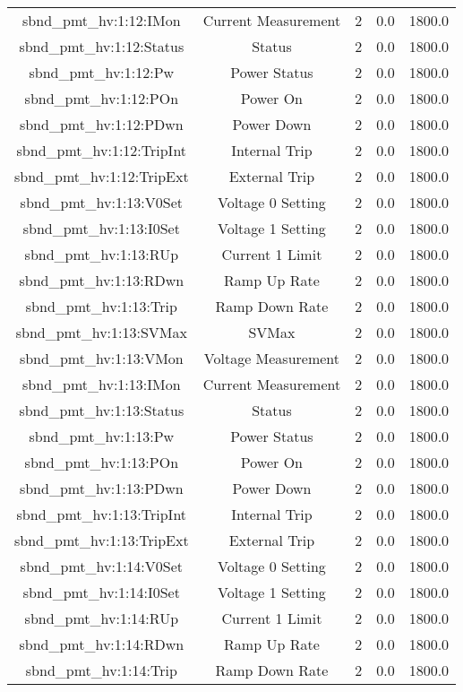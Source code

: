 \begin{table}[ptb]
\begin{tabular}{c | c c c c}
sbnd_pmt_hv:1:12:IMon & Current Measurement & 2 & 0.0 & 1800.0\\ 
sbnd_pmt_hv:1:12:Status & Status & 2 & 0.0 & 1800.0\\ 
sbnd_pmt_hv:1:12:Pw & Power Status & 2 & 0.0 & 1800.0\\ 
sbnd_pmt_hv:1:12:POn & Power On & 2 & 0.0 & 1800.0\\ 
sbnd_pmt_hv:1:12:PDwn & Power Down & 2 & 0.0 & 1800.0\\ 
sbnd_pmt_hv:1:12:TripInt & Internal Trip & 2 & 0.0 & 1800.0\\ 
sbnd_pmt_hv:1:12:TripExt & External Trip & 2 & 0.0 & 1800.0\\ 
sbnd_pmt_hv:1:13:V0Set & Voltage 0 Setting & 2 & 0.0 & 1800.0\\ 
sbnd_pmt_hv:1:13:I0Set & Voltage 1 Setting & 2 & 0.0 & 1800.0\\ 
sbnd_pmt_hv:1:13:RUp & Current 1 Limit & 2 & 0.0 & 1800.0\\ 
sbnd_pmt_hv:1:13:RDwn & Ramp Up Rate & 2 & 0.0 & 1800.0\\ 
sbnd_pmt_hv:1:13:Trip & Ramp Down Rate & 2 & 0.0 & 1800.0\\ 
sbnd_pmt_hv:1:13:SVMax & SVMax & 2 & 0.0 & 1800.0\\ 
sbnd_pmt_hv:1:13:VMon & Voltage Measurement & 2 & 0.0 & 1800.0\\ 
sbnd_pmt_hv:1:13:IMon & Current Measurement & 2 & 0.0 & 1800.0\\ 
sbnd_pmt_hv:1:13:Status & Status & 2 & 0.0 & 1800.0\\ 
sbnd_pmt_hv:1:13:Pw & Power Status & 2 & 0.0 & 1800.0\\ 
sbnd_pmt_hv:1:13:POn & Power On & 2 & 0.0 & 1800.0\\ 
sbnd_pmt_hv:1:13:PDwn & Power Down & 2 & 0.0 & 1800.0\\ 
sbnd_pmt_hv:1:13:TripInt & Internal Trip & 2 & 0.0 & 1800.0\\ 
sbnd_pmt_hv:1:13:TripExt & External Trip & 2 & 0.0 & 1800.0\\ 
sbnd_pmt_hv:1:14:V0Set & Voltage 0 Setting & 2 & 0.0 & 1800.0\\ 
sbnd_pmt_hv:1:14:I0Set & Voltage 1 Setting & 2 & 0.0 & 1800.0\\ 
sbnd_pmt_hv:1:14:RUp & Current 1 Limit & 2 & 0.0 & 1800.0\\ 
sbnd_pmt_hv:1:14:RDwn & Ramp Up Rate & 2 & 0.0 & 1800.0\\ 
sbnd_pmt_hv:1:14:Trip & Ramp Down Rate & 2 & 0.0 & 1800.0\\ 

\end{tabular}
\end{table}
